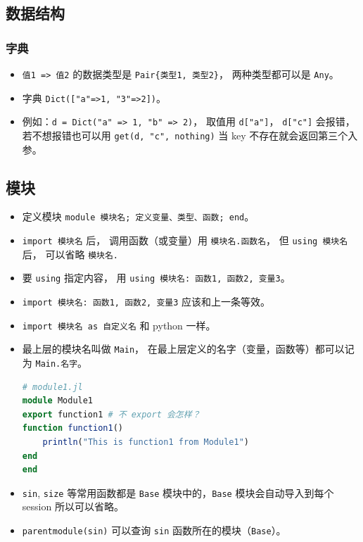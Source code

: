 \subsection{数据结构}
\subsubsection{字典}
\begin{itemize}
\item \verb`值1 => 值2` 的数据类型是 \verb`Pair{类型1, 类型2}`， 两种类型都可以是 \verb`Any`。
\item 字典 \verb`Dict(["a"=>1, "3"=>2])`。
\item 例如：\verb`d = Dict("a" => 1, "b" => 2)`， 取值用 \verb`d["a"]`， \verb`d["c"]` 会报错， 若不想报错也可以用 \verb`get(d, "c", nothing)` 当 key 不存在就会返回第三个入参。
\end{itemize}

\subsection{模块}
\begin{itemize}
\item 定义模块 \verb`module 模块名; 定义变量、类型、函数; end`。
\item \verb`import 模块名` 后， 调用函数（或变量）用 \verb`模块名.函数名`， 但 \verb`using 模块名` 后， 可以省略 \verb`模块名.`
\item 要 \verb`using` 指定内容， 用 \verb`using 模块名: 函数1, 函数2, 变量3`。
\item \verb`import 模块名: 函数1, 函数2, 变量3` 应该和上一条等效。
\item \verb`import 模块名 as 自定义名` 和 python 一样。
\item 最上层的模块名叫做 \verb`Main`， 在最上层定义的名字（变量，函数等）都可以记为 \verb`Main.名字`。
\begin{lstlisting}[language=julia]
# module1.jl
module Module1
export function1 # 不 export 会怎样？
function function1()
    println("This is function1 from Module1")
end
end
\end{lstlisting}
\item \verb`sin`, \verb`size` 等常用函数都是 \verb`Base` 模块中的，\verb`Base` 模块会自动导入到每个 session 所以可以省略。
\item \verb`parentmodule(sin)` 可以查询 \verb`sin` 函数所在的模块（\verb`Base`）。
\end{itemize}



